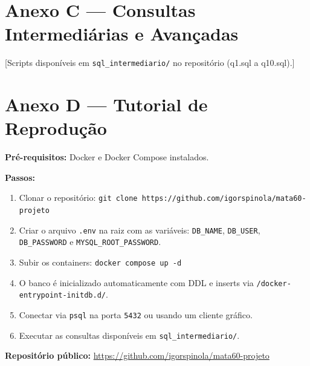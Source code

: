 \documentclass[12pt]{article}
\begin{document}
\section{Anexo C --- Consultas Intermediárias e Avançadas}
\label{anx:queries}
% 
[Scripts disponíveis em \texttt{sql\_intermediario/} no repositório (q1.sql a q10.sql).]

\section{Anexo D --- Tutorial de Reprodução}
\label{anx:tutorial}

\textbf{Pré-requisitos:} Docker e Docker Compose instalados.

\textbf{Passos:}
\begin{enumerate}
    \item Clonar o repositório: \texttt{git clone https://github.com/igorspinola/mata60-projeto}
    \item Criar o arquivo \texttt{.env} na raiz com as variáveis:
          \texttt{DB\_NAME}, \texttt{DB\_USER}, \texttt{DB\_PASSWORD} e \texttt{MYSQL\_ROOT\_PASSWORD}.
    \item Subir os containers: \texttt{docker compose up -d}
    \item O banco é inicializado automaticamente com DDL e inserts via
          \texttt{/docker-entrypoint-initdb.d/}.
    \item Conectar via \texttt{psql} na porta \texttt{5432} ou usando um cliente gráfico.
    \item Executar as consultas disponíveis em \texttt{sql\_intermediario/}.
\end{enumerate}

\textbf{Repositório público:} \url{https://github.com/igorspinola/mata60-projeto}
\end{document}
